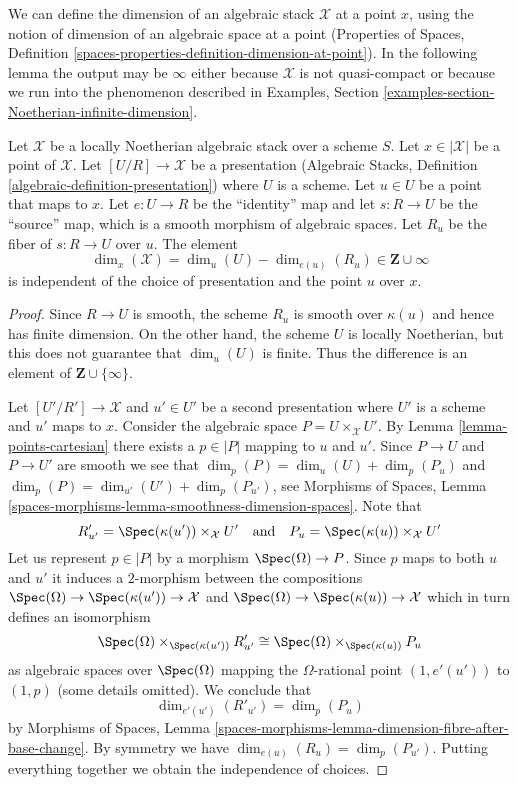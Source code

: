 \noindent
We can define the dimension of an algebraic stack $\mathcal{X}$
at a point $x$, using the notion of dimension of an algebraic space
at a point (Properties of Spaces, Definition
\ref{spaces-properties-definition-dimension-at-point}).
In the following lemma the output may be $\infty$ either because
$\mathcal{X}$ is not quasi-compact or because we run into the
phenomenon described in Examples, Section
\ref{examples-section-Noetherian-infinite-dimension}.

\begin{lemma}
\label{lemma-dimension-at-point-well-defined}
Let $\mathcal{X}$ be a locally Noetherian algebraic stack over a scheme $S$.
Let $x \in |\mathcal{X}|$ be a point of $\mathcal{X}$.
Let $[U/R] \to \mathcal{X}$ be a presentation
(Algebraic Stacks, Definition \ref{algebraic-definition-presentation})
where $U$ is a scheme. Let $u \in U$ be a point that maps to $x$.
Let $e : U \to R$ be the ``identity'' map and let $s : R \to U$ be the
``source'' map, which is a smooth morphism of algebraic spaces. Let $R_u$
be the fiber of $s : R \to U$ over $u$. The element
$$
\dim_x(\mathcal{X}) = \dim_u(U) - \dim_{e(u)}(R_u) \in \mathbf{Z} \cup \infty
$$
is independent of the choice of presentation and the point $u$ over $x$.
\end{lemma}

\begin{proof}
Since $R \to U$ is smooth, the scheme $R_u$ is smooth over $\kappa(u)$
and hence has finite dimension. On the other hand, the scheme $U$
is locally Noetherian, but this does not guarantee that
$\dim_u(U)$ is finite. Thus the difference is an element of
$\mathbf{Z} \cup \{\infty\}$.

\medskip\noindent
Let $[U'/R'] \to \mathcal{X}$ and $u' \in U'$ be a second presentation
where $U'$ is a scheme and $u'$ maps to $x$. Consider the algebraic
space $P = U \times_\mathcal{X} U'$. By
Lemma \ref{lemma-points-cartesian} there exists a $p \in |P|$ mapping to
$u$ and $u'$. Since $P \to U$ and $P \to U'$ are smooth we see that
$\dim_p(P) = \dim_u(U) + \dim_p(P_u)$ and
$\dim_p(P) = \dim_{u'}(U') + \dim_p(P_{u'})$, see
Morphisms of Spaces, Lemma
\ref{spaces-morphisms-lemma-smoothness-dimension-spaces}.
Note that
$$
R'_{u'} = \Spec(\kappa(u')) \times_\mathcal{X} U'
\quad\text{and}\quad
P_u = \Spec(\kappa(u)) \times_\mathcal{X} U'
$$
Let us represent $p \in |P|$ by a morphism $\Spec(\Omega) \to P$.
Since $p$ maps to both $u$ and $u'$ it induces a $2$-morphism
between the compositions
$\Spec(\Omega) \to \Spec(\kappa(u')) \to \mathcal{X}$ and
$\Spec(\Omega) \to \Spec(\kappa(u)) \to \mathcal{X}$
which in turn defines an isomorphism
$$
\Spec(\Omega) \times_{\Spec(\kappa(u'))} R'_{u'}
\cong
\Spec(\Omega) \times_{\Spec(\kappa(u))} P_u
$$
as algebraic spaces over $\Spec(\Omega)$ mapping the $\Omega$-rational
point $(1, e'(u'))$ to $(1, p)$ (some details omitted). We conclude that
$$
\dim_{e'(u')}(R'_{u'}) = \dim_p(P_u)
$$
by Morphisms of Spaces, Lemma
\ref{spaces-morphisms-lemma-dimension-fibre-after-base-change}.
By symmetry we have
$\dim_{e(u)}(R_u) = \dim_p(P_{u'})$.
Putting everything together we obtain the independence of choices.
\end{proof}

